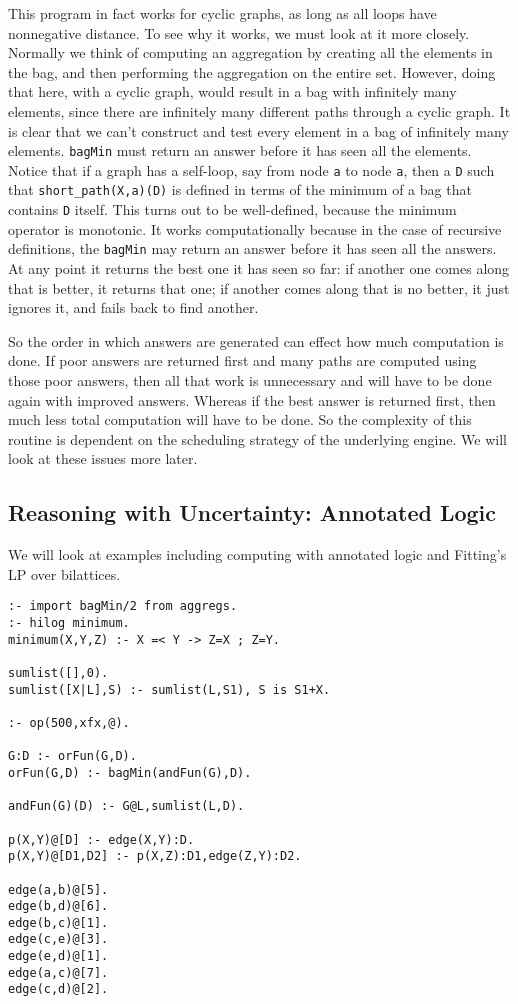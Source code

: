 This program in fact works for cyclic graphs, as long as all loops
have nonnegative distance.  To see why it works, we must look at it
more closely.  Normally we think of computing an aggregation by
creating all the elements in the bag, and then performing the
aggregation on the entire set.  However, doing that here, with a
cyclic graph, would result in a bag with infinitely many elements,
since there are infinitely many different paths through a cyclic
graph.  It is clear that we can't construct and test every element in
a bag of infinitely many elements.  \verb|bagMin| must return an
answer before it has seen all the elements.  Notice that if a graph
has a self-loop, say from node \verb|a| to node \verb|a|, then a
\verb|D| such that \verb|short_path(X,a)(D)| is defined in terms of
the minimum of a bag that contains \verb|D| itself.  This turns out to
be well-defined, because the minimum operator is monotonic.  It works
computationally because in the case of recursive definitions, the
\verb|bagMin| may return an answer before it has seen all the answers.
At any point it returns the best one it has seen so far: if another
one comes along that is better, it returns that one; if another comes
along that is no better, it just ignores it, and fails back to find
another.

So the order in which answers are generated can effect how much
computation is done.  If poor answers are returned first and many
paths are computed using those poor answers, then all that work is
unnecessary and will have to be done again with improved answers.
Whereas if the best answer is returned first, then much less total
computation will have to be done.  So the complexity of this routine
is dependent on the scheduling strategy of the underlying engine.  We
will look at these issues more later.

\subsection{Reasoning with Uncertainty: Annotated Logic}

We will look at examples including computing with annotated logic and
Fitting's LP over bilattices.

\begin{verbatim}
:- import bagMin/2 from aggregs.
:- hilog minimum.
minimum(X,Y,Z) :- X =< Y -> Z=X ; Z=Y.

sumlist([],0).
sumlist([X|L],S) :- sumlist(L,S1), S is S1+X.

:- op(500,xfx,@).

G:D :- orFun(G,D).
orFun(G,D) :- bagMin(andFun(G),D).

andFun(G)(D) :- G@L,sumlist(L,D).

p(X,Y)@[D] :- edge(X,Y):D.
p(X,Y)@[D1,D2] :- p(X,Z):D1,edge(Z,Y):D2.

edge(a,b)@[5].
edge(b,d)@[6].
edge(b,c)@[1].
edge(c,e)@[3].
edge(e,d)@[1].
edge(a,c)@[7].
edge(c,d)@[2].
\end{verbatim}


